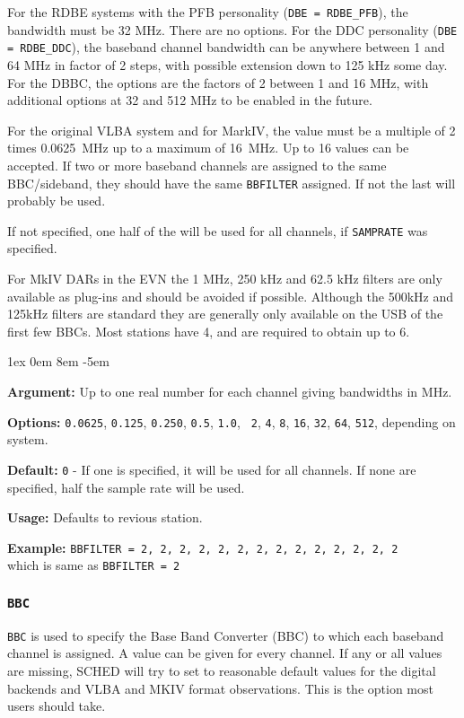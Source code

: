 \documentclass{report}
\newcommand{\rcwbox}[5]{
  \begin{list}{}{\parsep 1ex  \itemsep 0em
                 \leftmargin 8em  \itemindent -5em }
    \item {\bf Argument:} #1
    \item {\bf Options:}  #2
    \item {\bf Default:}  #3
    \item {\bf Usage:}    #4
    \item {\bf Example:}  #5
  \end{list}
}
\begin{document}
For the RDBE systems with the PFB personality ({\tt DBE = RDBE\_PFB}),
the bandwidth must be 32 MHz.  There are no options.  For the DDC
personality ({\tt DBE = RDBE\_DDC}), the baseband channel
bandwidth can be anywhere between 1 and 64 MHz in factor of 2
steps, with possible extension down to 125 kHz some day.  For the 
DBBC, the options are the factors of 2 between 1 and 16 MHz, with
additional options at 32 and 512 MHz to be enabled in the future.

For the original VLBA system and for MarkIV, the value must be a
multiple of 2 times 0.0625~MHz up to a maximum of 16~MHz. Up to 16
values can be accepted. If two or more baseband channels are assigned
to the same BBC/sideband, they should have the same {\tt BBFILTER}
assigned. If not the last will probably be used.

If not specified, one half of the 
will be used for all channels, if {\tt SAMPRATE} was specified.

For MkIV DARs in the EVN the 1 MHz, 250 kHz and 62.5 kHz filters
are only available as plug-ins and should be avoided if possible.
Although the 500kHz and 125kHz filters are standard they are generally
only available on the USB of the first few BBCs. Most stations have 4,
and are required to obtain up to 6.

\rcwbox
{Up to one real number for each channel giving bandwidths in MHz.}
{{\tt 0.0625}, {\tt 0.125}, {\tt 0.250}, {\tt 0.5}, {\tt 1.0}, {\tt
2}, {\tt 4}, {\tt 8}, {\tt 16}, {\tt 32}, {\tt 64}, {\tt 512},
depending on system.}
{{\tt 0} - If one is specified, it will be used for all channels.
If none are specified, half the sample rate will be used.}
{Defaults to revious station.}
{{\tt BBFILTER = 2, 2, 2, 2, 2, 2, 2, 2, 2, 2, 2, 2, 2, 2} \\ which
is same as {\tt BBFILTER = 2}}

\subsubsection{\label{SP:BBC}{\tt BBC}}

{\tt BBC} is used to specify the Base Band Converter (BBC) to
which each baseband channel is assigned.  A value can be given
for every channel.  If any or all values are missing, SCHED will
try to set to reasonable default values for the digital backends
and VLBA and MKIV format observations.  This is the option most
users should take.
\end{document}
